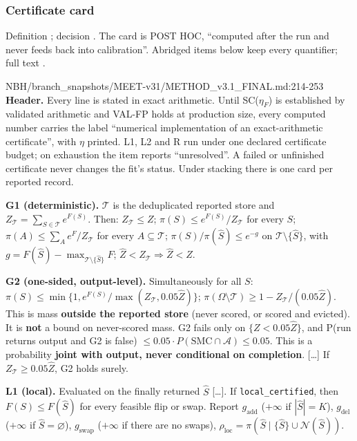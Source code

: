 \subsubsection{Certificate card}\label{sec:method-card}
Definition ; decision . The card is POST HOC, ``computed after the run and never feeds back into
calibration''. Abridged items below keep every quantifier; full text .
\begin{stmt}{NBH/branch_snapshots/MEET-v31/METHOD_v3.1_FINAL.md:214-253}
\textbf{Header.} Every line is stated in exact arithmetic. Until SC($\eta_F$) is established by validated arithmetic and VAL-FP holds at
production size, every computed number carries the label ``numerical implementation of an exact-arithmetic certificate'', with $\eta$
printed. L1, L2 and R run under one declared certificate budget; on exhaustion the item reports ``unresolved''. A failed or unfinished
certificate never changes the fit's status. Under stacking there is one card per reported record.

\textbf{G1 (deterministic).} $\mathcal T$ is the deduplicated reported store and $Z_{\mathcal T}=\sum_{S\in\mathcal T}e^{F(S)}$. Then: $Z_{\mathcal T}\le Z$;
$\pi(S)\le e^{F(S)}/Z_{\mathcal T}$ for every $S$; $\pi(A)\le\sum_Ae^F/Z_{\mathcal T}$ for every $A\subseteq\mathcal T$; $\pi(S)/\pi(\hat S)\le e^{-g}$ on
$\mathcal T\setminus\{\hat S\}$, with $g=F(\hat S)-\max_{\mathcal T\setminus\{\hat S\}}F$; $\hat Z<Z_{\mathcal T}\Rightarrow\hat Z<Z$.

\textbf{G2 (one-sided, output-level).} Simultaneously for all $S$: $\pi(S)\le\min\{1,e^{F(S)}/\max(Z_{\mathcal T},0.05\hat Z)\}$;
$\pi(\Omega\setminus\mathcal T)\ge1-Z_{\mathcal T}/(0.05\hat Z)$. This is mass \textbf{outside the reported store} (never scored, or scored and
evicted). It is \textbf{not} a bound on never-scored mass. G2 fails only on $\{Z<0.05\hat Z\}$, and P(run returns output and G2 is false)
$\le0.05\cdot P(\mathrm{SMC}\cap\mathcal A)\le0.05$. This is a probability \textbf{joint with output, never conditional on completion}. [\dots]
If $Z_{\mathcal T}\ge0.05\hat Z$, G2 holds surely.

\textbf{L1 (local).} Evaluated on the finally returned $\hat S$ [\dots]. If \texttt{local\_certified}, then $F(S)\le F(\hat S)$ for every
feasible flip or swap. Report $g_{\mathrm{add}}$ ($+\infty$ if $|\hat S|=K$), $g_{\mathrm{del}}$ ($+\infty$ if $\hat S=\varnothing$),
$g_{\mathrm{swap}}$ ($+\infty$ if there are no swaps), $\rho_{\mathrm{loc}}=\pi(\hat S\mid\{\hat S\}\cup\mathcal N(\hat S))$.


\end{stmt}
